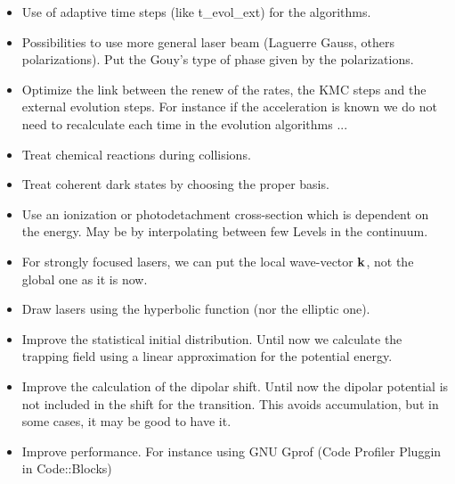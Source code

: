 \documentclass[amsmath,amssymb,nofootinbib]{revtex4-2}
\begin{document}
	 \begin{itemize}
	 	

	
	 	\item Use of adaptive time steps (like t\_evol\_ext) for the algorithms.
	 	
	 	\item Possibilities to use more general laser beam (Laguerre Gauss, others polarizations). 	Put the Gouy's type of  phase given by the polarizations.
	 	
	 	\item Optimize the link between the renew of the rates, the KMC steps and the external evolution steps. For instance if the acceleration is known we do not need to recalculate each time in the evolution algorithms ...
	 	
	 
	 
	 	
	 	\item Treat chemical reactions during collisions.
	 	
	 	\item Treat coherent dark states by choosing the proper basis.
	 	
	 	\item Use an ionization or photodetachment cross-section which is dependent on the energy. May be by interpolating between few Levels in the continuum.
	 	
	 	\item For strongly focused lasers, we can put the local wave-vector $\bf k$, not the global one as it is now.
	 	
	 	\item Draw lasers using the hyperbolic function (nor the elliptic one).
	 	
	 	\item Improve the statistical initial distribution. Until now we calculate the trapping field using a linear approximation for the potential energy.
	 	
	 	\item Improve the calculation of the dipolar shift. Until now the dipolar potential is not included in the shift for the transition. This avoids accumulation, but in some cases, it may be good to have it.
	 	
	 	\item Improve performance. For instance using GNU Gprof (Code Profiler Pluggin in Code::Blocks)
	 	
	 	
	 \end{itemize}
	 
	 
	 
\end{document}
